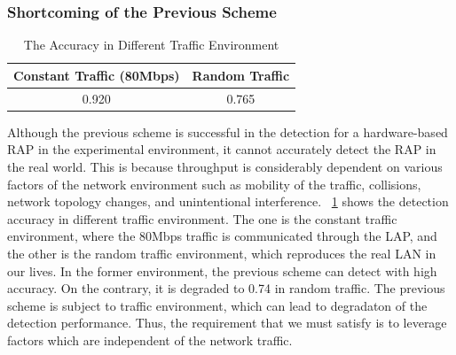 \documentclass[conference]{IEEEtran}
\begin{document}
\subsubsection{Shortcoming of the Previous Scheme}\label{sec:shortcoming}
\begin{table}[t] 
    \begin{center}
        \caption{The Accuracy in Different Traffic Environment}
        \label{tab:thrput result}
        \begin{tabular}{c c} \hline
            Constant Traffic (80Mbps) & Random Traffic \\ \hline \hline
            0.920 & 0.765 \\ \hline
        \end{tabular}
    \end{center}
    \vspace{-2zh}
\end{table}
Although the previous scheme is successful in the detection for a hardware-based RAP in the experimental environment, it cannot accurately detect the RAP in the real world.
This is because throughput is considerably dependent on various factors of the network environment such as mobility of the traffic, collisions, network topology changes, and unintentional interference.
\tablename~\ref{tab:thrput result} shows the detection accuracy in different traffic environment.
The one is the constant traffic environment, where the 80Mbps traffic is communicated through the LAP, and the other is the random traffic environment, which reproduces the real LAN in our lives.
In the former environment, the previous scheme can detect with high accuracy.
On the contrary, it is degraded to 0.74 in random traffic.
The previous scheme is subject to traffic environment, which can lead to degradaton of the detection performance.
Thus, the requirement that we must satisfy is to leverage factors which are independent of the network traffic.
\end{document}

